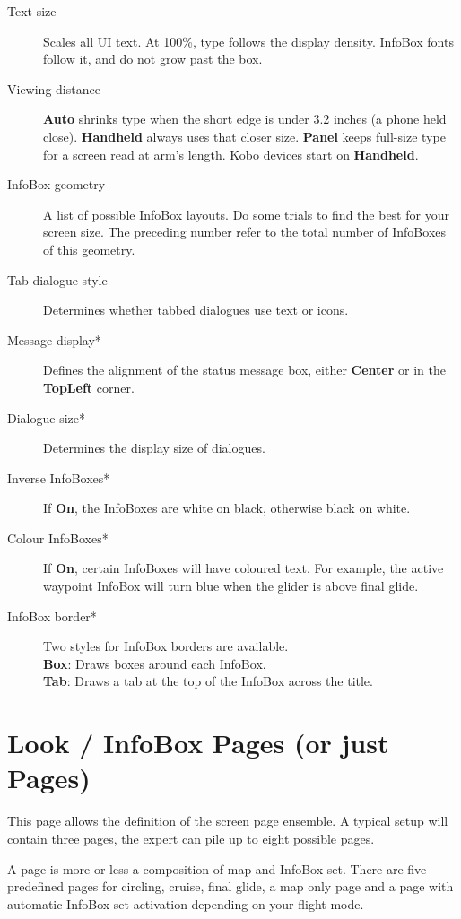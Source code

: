 \begin{description}
\item[Text size]  Scales all UI text. At 100\%, type follows the
  display density. InfoBox fonts follow it, and do not grow past
  the box.
\item[Viewing distance]  {\bf Auto} shrinks type when the short edge
  is under 3.2 inches (a phone held close). {\bf Handheld} always
  uses that closer size. {\bf Panel} keeps full-size type for a
  screen read at arm's length. Kobo devices start on {\bf Handheld}.
\item[InfoBox geometry]  A list of possible InfoBox layouts. Do some trials to find the 
  best for your screen size. The preceding number refer to the total number of 
  InfoBoxes of this geometry.
\item[Tab dialogue style]  Determines whether tabbed dialogues use text or icons.
\item[Message display*]  Defines the alignment of the status message box, either 
  {\bf Center} or in the {\bf TopLeft} corner.
\item[Dialogue size*]  Determines the display size of dialogues.
\item[Inverse InfoBoxes*]  If {\bf On}, the InfoBoxes are white on black, otherwise 
  black on white.
\item[Colour InfoBoxes*]  If {\bf On}, certain InfoBoxes will have coloured text. For 
  example, the active waypoint InfoBox will turn blue when the glider is above final 
  glide.
\item[InfoBox border*]  Two styles for InfoBox borders are available. \\
  {\bf Box}: Draws boxes around each InfoBox. \\
  {\bf Tab}: Draws a tab at the top of the InfoBox across the
  title. \\
\end{description}


\section{Look / InfoBox Pages (or just Pages)}\label{conf:screenpages}

This page allows the definition of the screen page ensemble. A typical setup 
will contain three pages, the expert can pile up to eight possible pages.

A page is more or less a composition of map and InfoBox set. There are five 
predefined pages for circling, cruise, final glide, a map only page and a 
page with automatic InfoBox set activation depending on your flight mode.

